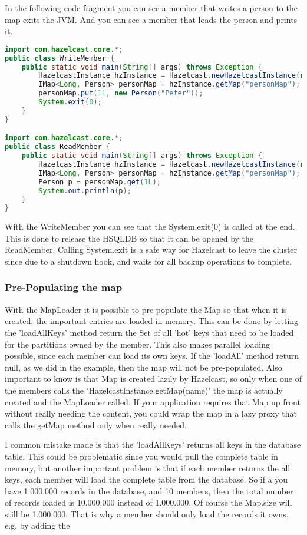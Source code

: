 In the following code fragment you can see a member that writes a person to the map exits the JVM. And you can see a member that loads the person and prints it. 
\begin{lstlisting}[language=java]
import com.hazelcast.core.*;
public class WriteMember {
    public static void main(String[] args) throws Exception {
        HazelcastInstance hzInstance = Hazelcast.newHazelcastInstance(null);
        IMap<Long, Person> personMap = hzInstance.getMap("personMap");
        personMap.put(1L, new Person("Peter"));
        System.exit(0);
    }
}

import com.hazelcast.core.*;
public class ReadMember {
    public static void main(String[] args) throws Exception {
        HazelcastInstance hzInstance = Hazelcast.newHazelcastInstance(null);
        IMap<Long, Person> personMap = hzInstance.getMap("personMap");
        Person p = personMap.get(1L);
        System.out.println(p);
    }
}
\end{lstlisting}
With the WriteMember you can see that the System.exit(0) is called at the end. This is done to release the HSQLDB so that it can be opened by the ReadMember. Calling System.exit is a safe way for Hazelcast to leave the cluster since due to a shutdown hook, and waits for all backup operations to complete.

\subsubsection{Pre-Populating the map}
With the MapLoader it is possible to pre-populate the Map so that when it is created, the important entries are loaded in memory. This can be done by letting the 'loadAllKeys' method return the Set of all 'hot' keys that need to be loaded for the partitions owned by the member. This also makes parallel loading possible, since each member can load its own keys.  If the 'loadAll' method return null, as we did in the example, then the map will not be pre-populated. Also important to know is that Map is created lazily by Hazelcast, so only when one of the members calls the 'HazelcastInstance.getMap(name)' the map is actually created and the MapLoader called. If your application requires that Map up front without really needing the content, you could wrap the map in a lazy proxy that calls the getMap method only when really needed.

I common mistake made is that the 'loadAllKeys' returns all keys in the database table. This could be problematic since you would pull the complete table in memory, but another important problem is that if each member returns the all keys, each member will load the complete table from the database. So if a you have 1.000.000 records in the database, and 10 members, then the total number of records loaded is 10.000.000 instead of 1.000.000. Of course the Map.size will still be 1.000.000. That is why a member should only load the records it owns, e.g. by adding the 

